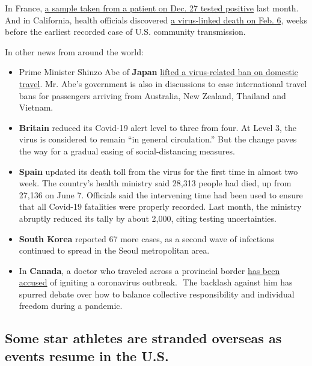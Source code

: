 In France,
\href{https://www.nytimes.com/2020/05/05/world/europe/france-coronavirus-timeline.html}{a
sample taken from a patient on Dec. 27 tested positive} last month. And
in California, health officials discovered
\href{https://www.nytimes.com/2020/04/22/us/santa-clara-county-coronavirus-death.html}{a
virus-linked death on Feb. 6}, weeks before the earliest recorded case
of U.S. community transmission.

In other news from around the world:

\begin{itemize}
\item
  Prime Minister Shinzo Abe of \textbf{Japan}
  \href{https://www.nytimes.com/reuters/2020/06/18/world/asia/18reuters-health-coronavirus-japan-tourism.html}{lifted
  a virus-related ban on domestic travel}. Mr. Abe's government is also
  in discussions to ease international travel bans for passengers
  arriving from Australia, New Zealand, Thailand and Vietnam.
\item
  \textbf{Britain} reduced its Covid-19 alert level to three from four.
  At Level 3, the virus is considered to remain ``in general
  circulation.'' But the change paves the way for a gradual easing of
  social-distancing measures.
\item
  \textbf{Spain} updated its death toll from the virus for the first
  time in almost two week. The country's health ministry said 28,313
  people had died, up from 27,136 on June 7. Officials said the
  intervening time had been used to ensure that all Covid-19 fatalities
  were properly recorded. Last month, the ministry abruptly reduced its
  tally by about 2,000, citing testing uncertainties.
\item
  \textbf{South Korea} reported 67 more cases, as a second wave of
  infections continued to spread in the Seoul metropolitan area.
\item
  In \textbf{Canada}, a doctor who traveled across a provincial border
  \href{https://nyti.ms/2YFwLqs}{has been accused} of igniting a
  coronavirus outbreak. ​ ​​The backlash against him has spurred debate
  over how to balance collective responsibility and individual freedom
  during a pandemic.
\end{itemize}

\hypertarget{some-star-athletes-are-stranded-overseas-as-events-resume-in-the-us}{%
\subsection{Some star athletes are stranded overseas as events resume in
the
U.S.}\label{some-star-athletes-are-stranded-overseas-as-events-resume-in-the-us}}

